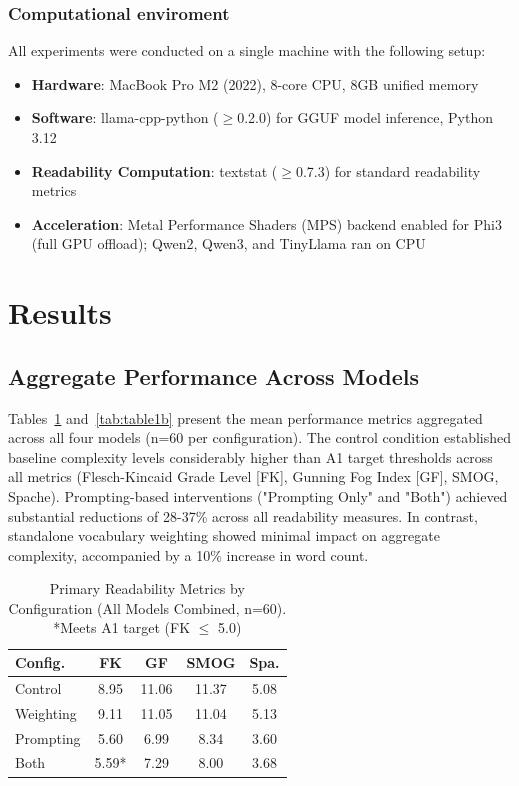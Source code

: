 \documentclass[10pt, a4paper]{article}
\begin{document}
\subsubsection{Computational enviroment}
All experiments were conducted on a single machine with the following setup:

\begin{itemize}
    \item \textbf{Hardware}: MacBook Pro M2 (2022), 8-core CPU, 8GB unified memory
    \item \textbf{Software}: llama-cpp-python ($\geq$0.2.0) for GGUF model inference, Python 3.12
    \item \textbf{Readability Computation}: textstat ($\geq$0.7.3) for standard readability metrics
    \item \textbf{Acceleration}: Metal Performance Shaders (MPS) backend enabled for Phi3 (full GPU offload); Qwen2, Qwen3, and TinyLlama ran on CPU
\end{itemize}

\section{Results}

\subsection{Aggregate Performance Across Models}

Tables~\ref{tab:table1a} and~\ref{tab:table1b} present the mean performance metrics aggregated across all four models (n=60 per configuration). The control condition established baseline complexity levels considerably higher than A1 target thresholds across all metrics (Flesch-Kincaid Grade Level [FK], Gunning Fog Index [GF], SMOG, Spache). Prompting-based interventions ("Prompting Only" and "Both") achieved substantial reductions of 28-37\% across all readability measures. In contrast, standalone vocabulary weighting showed minimal impact on aggregate complexity, accompanied by a 10\% increase in word count.

\begin{table}[!ht]
\begin{center}
\begin{tabular}{lcccc}
\hline
\textbf{Config.} & \textbf{FK} & \textbf{GF} & \textbf{SMOG} & \textbf{Spa.} \\
\hline
Control   & 8.95  & 11.06 & 11.37 & 5.08 \\
Weighting & 9.11  & 11.05 & 11.04 & 5.13 \\
Prompting & 5.60  & 6.99  & 8.34  & 3.60 \\
Both      & 5.59* & 7.29  & 8.00  & 3.68 \\
\hline
\end{tabular}
\caption{Primary Readability Metrics by Configuration (All Models Combined, n=60). *Meets A1 target (FK $\leq$ 5.0)}
\label{tab:table1a}
\end{center}
\end{table}
\end{document}
